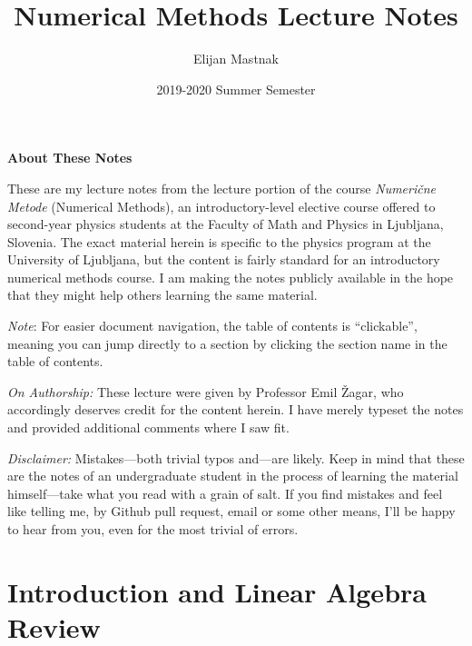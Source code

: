 \documentclass[11pt, a4paper]{article}
\begin{document}
\title{Numerical Methods Lecture Notes}
\author{Elijan Mastnak}
\date{2019-2020 Summer Semester}
\maketitle

\begin{center}
\textbf{About These Notes}
\end{center}
These are my lecture notes from the lecture portion of the course \textit{Numeri\v{c}ne Metode} (Numerical Methods), an introductory-level elective course offered to second-year physics students at the Faculty of Math and Physics in Ljubljana, Slovenia. The exact material herein is specific to the physics program at the University of Ljubljana, but the content is fairly standard for an introductory numerical methods course. I am making the notes publicly available in the hope that they might help others learning the same material.

\vspace{2mm}
\textit{Note}: For easier document navigation, the table of contents is ``clickable'', meaning you can jump directly to a section by clicking the section name in the table of contents.

\vspace{2mm}
\textit{On Authorship:} These lecture were given by Professor Emil \v{Z}agar, who accordingly deserves credit for the content herein. I have merely typeset the notes and provided additional comments where I saw fit.


\vspace{2mm}
\textit{Disclaimer:} Mistakes---both trivial typos and---are likely. Keep in mind that these are the notes of an undergraduate student in the process of learning the material himself---take what you read with a grain of salt. If you find mistakes and feel like telling me, by Github pull request, email or some other means, I'll be happy to hear from you, even for the most trivial of errors.



\tableofcontents

\newpage

\section{Introduction and Linear Algebra Review}
\end{document}
